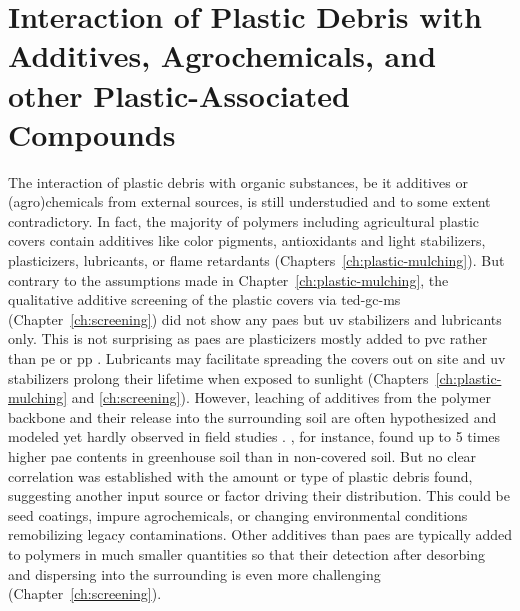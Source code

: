 \section[Interaction of Plastic Debris with Plastic-Associated Compounds]{Interaction of Plastic Debris with Additives, Agrochemicals, and other Plastic-Associated Compounds}
\label{sec:general-discussion:pacs}

The interaction of plastic debris with organic substances, be it additives or (agro)\-chemicals from external sources, is still understudied and to some extent contradictory.
In fact, the majority of polymers including agricultural plastic covers contain additives like color pigments, antioxidants and light stabilizers, plasticizers, lubricants, or flame retardants (Chapters~\ref{ch:plastic-mulching}). But contrary to the assumptions made in Chapter~\ref{ch:plastic-mulching}, the qualitative additive screening of the plastic covers via \ac{ted-gc-ms} (Chapter~\ref{ch:screening}) did not show any \acp{pae} but \ac{uv} stabilizers and lubricants only. This is not surprising as \acp{pae} are plasticizers mostly added to \ac{pvc} rather than \ac{pe} or \ac{pp} \citep{WaltersPlasticizers2020}. Lubricants may facilitate spreading the covers out on site and \ac{uv} stabilizers prolong their lifetime when exposed to sunlight (Chapters~\ref{ch:plastic-mulching} and \ref{ch:screening}).
However, leaching of additives from the polymer backbone and their release into the surrounding soil are often hypothesized \citep[Chapter~\ref{ch:plastic-mulching};][]{PathanSoil2020,ZhangTransport2020} and modeled \citep{ZhangAgricultural2021} yet hardly observed in field studies \citep{QiBehavior2020}.
, for instance, found up to \num{5} times higher \ac{pae} contents in greenhouse soil than in non-covered soil. But no clear correlation was established with the amount or type of plastic debris found, suggesting another input source or factor driving their distribution. This could be seed coatings, impure agrochemicals, or changing environmental conditions remobilizing legacy contaminations.
Other additives than \acp{pae} are typically added to polymers in much smaller quantities \citep{HahladakisOverview2018} so that their detection after desorbing and dispersing into the surrounding is even more challenging (Chapter~\ref{ch:screening}).

